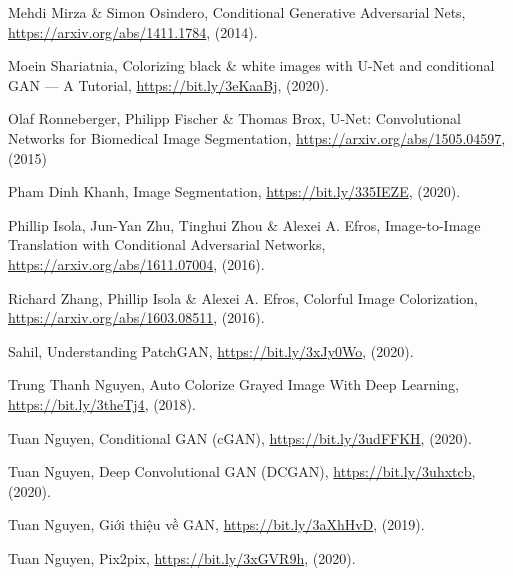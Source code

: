 \documentclass[a4paper]{article}
\begin{document}
\begin{thebibliography}{80}
     Mehdi Mirza \& Simon Osindero, Conditional Generative Adversarial Nets,\\ \href{https://arxiv.org/abs/1411.1784}{https://arxiv.org/abs/1411.1784}, (2014).

     Moein Shariatnia, Colorizing black \& white images with U-Net and conditional GAN — A Tutorial, \href{https://bit.ly/3eKaaBj}{https://bit.ly/3eKaaBj}, (2020).

     Olaf Ronneberger, Philipp Fischer \& Thomas Brox, U-Net: Convolutional Networks for Biomedical Image Segmentation, \href{https://arxiv.org/abs/1505.04597}{https://arxiv.org/abs/1505.04597}, (2015)

     Pham Dinh Khanh, Image Segmentation, \href{https://bit.ly/335IEZE}{https://bit.ly/335IEZE}, (2020).

     Phillip Isola, Jun-Yan Zhu, Tinghui Zhou \& Alexei A. Efros, Image-to-Image Translation with Conditional Adversarial Networks, \href{https://arxiv.org/abs/1611.07004}{https://arxiv.org/abs/1611.07004}, (2016).

     Richard Zhang, Phillip Isola \& Alexei A. Efros, Colorful Image Colorization,\\ \href{https://arxiv.org/abs/1603.08511}{https://arxiv.org/abs/1603.08511}, (2016).

     Sahil, Understanding PatchGAN, \href{https://bit.ly/3xJy0Wo}{https://bit.ly/3xJy0Wo}, (2020).

     Trung Thanh Nguyen, Auto Colorize Grayed Image With Deep Learning, \href{https://bit.ly/3theTj4}{https://bit.ly/3theTj4}, (2018).

     Tuan Nguyen, Conditional GAN (cGAN), \href{https://bit.ly/3udFFKH}{https://bit.ly/3udFFKH}, (2020).

     Tuan Nguyen, Deep Convolutional GAN (DCGAN), \href{https://bit.ly/3uhxtcb}{https://bit.ly/3uhxtcb}, (2020).

     Tuan Nguyen, Giới thiệu về GAN, \href{https://bit.ly/3aXhHvD}{https://bit.ly/3aXhHvD}, (2019).

     Tuan Nguyen, Pix2pix, \href{https://bit.ly/3xGVR9h}{https://bit.ly/3xGVR9h}, (2020).

\end{thebibliography}
\end{document}
